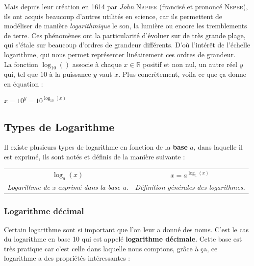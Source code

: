 \documentclass[a4paper, twoside]{article}
\begin{document}
		Mais depuis leur création en 1614 par \textit{John} {\scshape Napier} (francisé et prononcé {\scshape Neper}), ils ont acquis beaucoup d'autres utilités en science, car ils permettent de modéliser de manière \textit{logarithmique} le son, la lumière ou encore les tremblements de terre. Ces phénomènes ont la particularité d'évoluer sur de très grande plage, qui s'étale sur beaucoup d'ordres de grandeur différents. D'où l'intérêt de l'échelle logarithme, qui nous permet représenter linéairement ces ordres de grandeur. \\
		
		La fonction $\log_{10}()$ associe à chaque $x \in \mathbb{R}$ positif et non nul, un autre réel $y$ qui, tel que $10$ à la puissance $y$ vaut $x$.
		Plus concrètement, voila ce que ça donne en équation :

	\begin{center}
		\huge
		$ x = 10^y = 10^{\log_{10}(x)}$
	\end{center}

	\subsection*{Types de Logarithme}

	Il existe plusieurs types de logarithme en fonction de la \textbf{base} $a$, dans laquelle il est exprimé, ils sont notés et définis de la manière suivante :
		
	\begin{center}
	\begin{tabular}{c|c}

	{\huge $ \log_{a}(x) $}                          & {\huge $x = a ^{ \log_{a} (x)}$} \\
	\textit{Logarithme de x exprimé dans la base a.} & \textit{Définition générales des logarithmes.}\\

	\end{tabular}
	\end{center}

	\vspace{0.2cm}

	\subsubsection*{Logarithme décimal}

		Certain logarithme sont si important que l'on leur a donné des noms. C'est le cas du logarithme en base 10 qui est appelé \textbf{logarithme décimale}. Cette base est très pratique car c'est celle dans laquelle nous comptons, grâce à ça, ce logarithme a des propriétés intéressantes :	
		
\end{document}
